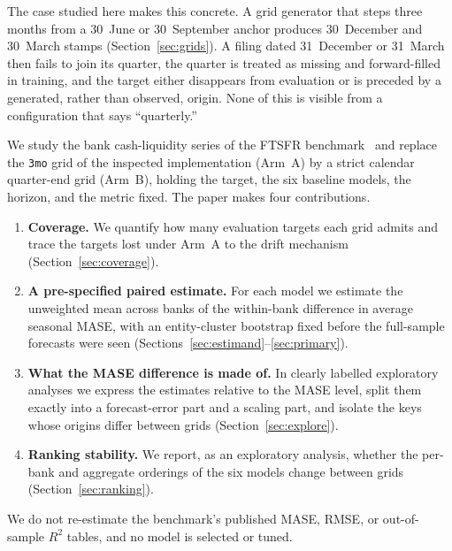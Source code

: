 \documentclass[11pt]{article}
\begin{document}
The case studied here makes this concrete. A grid generator that steps three months from a 30~June or 30~September anchor produces 30~December and 30~March stamps (Section~\ref{sec:grids}). A filing dated 31~December or 31~March then fails to join its quarter, the quarter is treated as missing and forward-filled in training, and the target either disappears from evaluation or is preceded by a generated, rather than observed, origin. None of this is visible from a configuration that says ``quarterly.''

We study the bank cash-liquidity series of the FTSFR benchmark~\cite{bejarano2026} and replace the \texttt{3mo} grid of the inspected implementation (Arm~A) by a strict calendar quarter-end grid (Arm~B), holding the target, the six baseline models, the horizon, and the metric fixed. The paper makes four contributions.
\begin{enumerate}
  \item \textbf{Coverage.} We quantify how many evaluation targets each grid admits and trace the targets lost under Arm~A to the drift mechanism (Section~\ref{sec:coverage}).
  \item \textbf{A pre-specified paired estimate.} For each model we estimate the unweighted mean across banks of the within-bank difference in average seasonal MASE, with an entity-cluster bootstrap fixed before the full-sample forecasts were seen (Sections~\ref{sec:estimand}--\ref{sec:primary}).
  \item \textbf{What the MASE difference is made of.} In clearly labelled exploratory analyses we express the estimates relative to the MASE level, split them exactly into a forecast-error part and a scaling part, and isolate the keys whose origins differ between grids (Section~\ref{sec:explore}).
  \item \textbf{Ranking stability.} We report, as an exploratory analysis, whether the per-bank and aggregate orderings of the six models change between grids (Section~\ref{sec:ranking}).
\end{enumerate}
We do not re-estimate the benchmark's published MASE, RMSE, or out-of-sample $R^2$ tables, and no model is selected or tuned.
\end{document}
